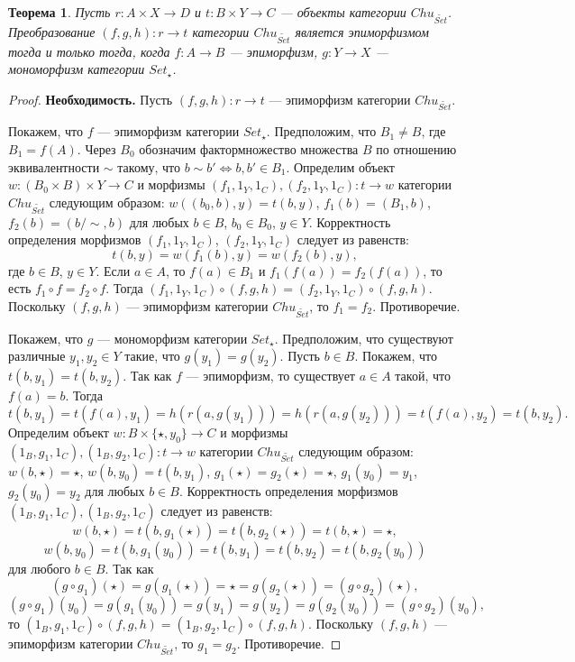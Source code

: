 \documentclass[a4paper,12pt]{article}
\newtheorem{theorem}{Теорема}
\begin{document}
\begin{theorem}\label{epimorphism}
    Пусть $r: A \times X \to D$ и $t: B \times Y \to C$ --- объекты категории $Chu_{\widetilde{Set}}$. Преобразование $(f,g,h): r \to t$ категории $Chu_{\widetilde{Set}}$ является эпиморфизмом тогда и только тогда, когда $f: A \to B$ --- эпиморфизм, $g: Y \to X$ --- мономорфизм категории $Set_{\star}$.
\end{theorem}
\begin{proof}
    \textbf{Необходимость.} Пусть $(f,g,h): r \to t$ --- эпиморфизм категории $Chu_{\widetilde{Set}}$.

    Покажем, что $f$ --- эпиморфизм категории $Set_{\star}$. Предположим, что $B_1 \ne B$, где $B_1 = f(A)$. Через $B_0$ обозначим фактормножество множества $B$ по отношению эквивалентности $\sim$ такому, что $b \sim b' \Leftrightarrow b, b' \in B_1$. Определим объект $w: (B_0 \times B) \times Y \to C$ и морфизмы $(f_1,1_Y,1_C), (f_2,1_Y,1_C): t \to w$ категории $Chu_{\widetilde{Set}}$ следующим образом: $w((b_0,b),y) = t(b,y)$, $f_1(b) = (B_1,b)$, $f_2(b) = (b/\sim,b)$ для любых $b \in B$, $b_0 \in B_0$, $y \in Y$. Корректность определения морфизмов $(f_1,1_Y,1_C)$, $(f_2,1_Y,1_C)$ следует из равенств:
    $$
        t(b,y) = w(f_1(b),y) = w(f_2(b),y),
    $$
    где $b \in B$, $y \in Y$. Если $a \in A$, то $f(a) \in B_1$ и $f_1(f(a)) = f_2(f(a))$, то есть $f_1 \circ f = f_2 \circ f$. Тогда $(f_1,1_Y,1_C) \circ (f,g,h) = (f_2,1_Y,1_C) \circ (f,g,h)$. Поскольку $(f,g,h)$ --- эпиморфизм категории $Chu_{\widetilde{Set}}$, то $f_1 = f_2$. Противоречие.

    Покажем, что $g$ --- мономорфизм категории $Set_{\star}$. Предположим, что существуют различные $y_1, y_2 \in Y$ такие, что $g(y_1) = g(y_2)$. Пусть $b \in B$. Покажем, что $t(b,y_1) = t(b,y_2)$. Так как $f$ --- эпиморфизм, то существует $a \in A$ такой, что $f(a) = b$. Тогда
    $$
        t(b,y_1) = t(f(a),y_1) = h(r(a,g(y_1))) = h(r(a,g(y_2))) = t(f(a),y_2) = t(b,y_2).
    $$
    Определим объект $w: B \times \{\star,y_0\} \to C$ и морфизмы $(1_B,g_1,1_C), (1_B,g_2,1_C): t \to w$ категории $Chu_{\widetilde{Set}}$ следующим образом: $w(b,\star) = \star$, $w(b,y_0) = t(b,y_1)$, $g_1(\star) = g_2(\star) = \star$, $g_1(y_0) = y_1$, $g_2(y_0) = y_2$ для любых $b \in B$. Корректность определения морфизмов $(1_B,g_1,1_C), (1_B,g_2,1_C)$ следует из равенств:
    $$
        w(b,\star) = t(b,g_1(\star)) = t(b,g_2(\star)) = t(b,\star) = \star,
    $$
    $$
        w(b,y_0) = t(b,g_1(y_0)) = t(b,y_1) = t(b,y_2) = t(b,g_2(y_0))
    $$
    для любого $b \in B$. Так как
    $$
        (g \circ g_1)(\star) = g(g_1(\star)) = \star = g(g_2(\star)) = (g \circ g_2)(\star),
    $$
    $$
        (g \circ g_1)(y_0) = g(g_1(y_0)) = g(y_1) = g(y_2) = g(g_2(y_0)) = (g \circ g_2)(y_0),
    $$
    то $(1_B,g_1,1_C) \circ (f,g,h) = (1_B,g_2,1_C) \circ (f,g,h)$. Поскольку $(f,g,h)$ --- эпиморфизм категории $Chu_{\widetilde{Set}}$, то $g_1 = g_2$. Противоречие.


\end{proof}
\end{document}
